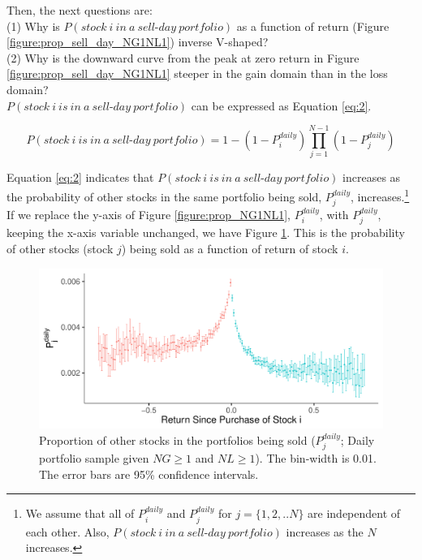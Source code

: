 \documentclass[11pt, a4paper]{article}
\begin{document}
Then, the next questions are:\\
(1) Why is $P(stock~i~in~a~sell\mbox{-}day~portfolio)$ as a function of return (Figure \ref{figure:prop_sell_day_NG1NL1}) inverse V-shaped?\\
(2) Why is the downward curve from the peak at zero return in Figure \ref{figure:prop_sell_day_NG1NL1} steeper in the gain domain than in the loss domain?\\


$P(stock~i~is~in~a~sell\mbox{-}day~portfolio)$ can be expressed as Equation \ref{eq:2}.%

\begin{equation}
\label{eq:2}
P(stock~i~is~in~a~sell\mbox{-}day~portfolio) =1-(1-P^{daily}_{i})\prod_{j=1}^{N-1}(1-P^{daily}_{j})
\end{equation}

Equation \ref{eq:2} indicates that $P(stock~i~is~in~a~sell\mbox{-}day~portfolio)$ increases as the probability of other stocks in the same portfolio being sold, $P^{daily}_{j}$, increases.\footnote{We assume that all of $P^{daily}_{i}$ and $P^{daily}_{j}$ for $j=\{1,2,..N\}$ are independent of each other. Also, $P(stock~i~in~a~sell\mbox{-}day~portfolio)$ increases as the $N$ increases.}\\

If we replace the y-axis of Figure \ref{figure:prop_NG1NL1}, $P^{daily}_{i}$, with $P^{daily}_{j}$, keeping the x-axis variable unchanged, we have Figure \ref{figure:prop_others_NG1NL1}. This is the probability of other stocks (stock $j$) being sold as a function of return of stock $i$.

\begin{figure}[H]
	\centering
	\includegraphics[width=0.8\columnwidth]{barc_other_sold_daily_NG1_NL1_3.pdf}
	\caption{Proportion of other stocks in the portfolios being sold ($P^{daily}_{j}$; Daily portfolio sample given $NG\geq1$ and $NL\geq1$). The bin-width is 0.01. The error bars are 95\% confidence intervals.}
	\label{figure:prop_others_NG1NL1}
\end{figure}
\end{document}
